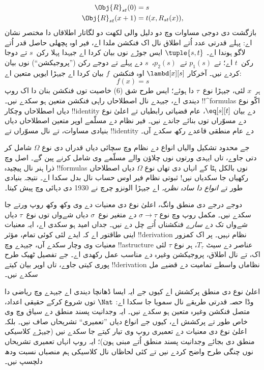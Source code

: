 \documentclass[../../../include/open-logic-section]{subfiles}
\begin{document}
\begin{align*}
\Obj{R}_{st}(0) & = s \\
\Obj{R}_{st}(x+1) & = t(x, R_{st}(x)),
\end{align*}
بازگشت دی دوجی مساوات وچ دو دلیل والی لکھت
دو لگاتار اطلاقاں دا مختصر نشان اے: پہلے قدرتی عدد
اُتے اطلاق نال اک فنکشن ملدا اے، فیر اوہ پچھلی
حاصل قدر اُتے لاگو ہوندا اے۔
$\tuple{s, t}$ ایس جوڑے
نوں بیان کردا اے جیہدا
پہلا رکن~$s$ تے دوجا
رکن~$t$ اے؛ تے $p_1(s)$
تے~$p_2(s)$،~$s$ دے
پہلے تے دوجے رکن
(”پروجیکشن“) نوں بیان
کردے نیں۔ آخرکار
$\lambd[x][s]$ اوہ
فنکشن~$f$ بیان کردا
اے جیہڑا ایویں
متعین اے:
\[
f(x) = s
\]
ہر~$x$ لئی، جیہڑا
نوع~$\tau$ دا ہوئے؛
ایس طرح شق (6)
خاصیت توں فنکشن بنان
دا اک روپ دیندی اے،
جیہدے نال اصطلاحاں
راہی فنکشن متعین
ہو سکدے نیں۔
!!^{formula}s اکّو
نوع دیاں اصطلاحاں
وچکار !!{identity}
دے بیان $\eq[s][t]$،
عام قضیاتی رابطیاں
تے اعلیٰ نوع دے
مسوّراں توں بنائے
جاندے نیں۔ فیر
نظام دے مسلّمے
اوپر متعین اصطلاحاں
دیاں بنیادی مساوات،
تے نال مسوّراں
تے !!{identity}
دے عام منطقی
قاعدے رکھ سکدے
آں۔

جے محدود تشکیل والیاں انواع دے
نظام وچ سچائی دیاں
قدراں دی نوع
$\Omega$ شامل کر
دتی جاوے، تاں
ایہدی ورتوں نوں
چلاؤن والے مسلّمے
وی شامل کرنے
پین گے۔ اصل وچ
ذرا ہنر نال
پیچیدہ !!{formula}s
نوں بالکل ہٹا
کے انہاں دی
تھاں نوع $\Omega$
دیاں اصطلاحاں
رکھیاں جا
سکدیاں نیں!{}
ثبوتی نظام
فیر اوس حساب
نال بدل
سکدا اے۔
نتیجہ بنیادی
طور تے
\emph{انواع دا
سادہ نظریہ}
اے جیہڑا
الونزو چرچ
نے 1930 دی
دہائی وچ
پیش کیتا۔

دوجے درجے
دی منطق
وانگ، اعلیٰ
نوع دی معنیات
دے وی وکھ
وکھ روپ
ورتے جا
سکدے نیں۔
مکمل روپ
وچ نوع
$\sigma \to \tau$
دے متغیر
نوع~$\sigma$
دیاں شےواں
توں نوع~$\tau$
دیاں شےواں
تک دے
\emph{سارے}
فنکشناں
اُتے چل
دے نیں۔
جداں امید
ہو سکدی
اے، ایہ
معنیات
اینی طاقتور
اے کہ
ایدے لئی
کوئی تمام،
مؤثر
!!{derivation}
نظام نہیں۔
پر اک
کمزور معنیات
وی وچار
سکدے آں،
جیہدے وچ
!!a{structure}
عناصر دے
سیٹ
$T_\tau$،
ہر نوع
$\tau$ لئی
اک، تے نال
اطلاق،
پروجیکشن
وغیرہ دے
مناسب عمل
رکھدی اے۔
جے تفصیل
ٹھیک طرح
پوری کیتی
جاوے، تاں
اوپر بیان
کیتے
!!{derivation}
نظاماں
واسطے
تمامیت دے
قضیے مل
سکدے نیں۔

اعلیٰ نوع
دی منطق
پرکشش اے
کیوں جے
ایہ ایسا
ڈھانچا دیندی
اے جیہدے
وچ ریاضی
دا وڈا حصہ
قدرتی طریقے
نال سمویا
جا سکدا اے:
$\Nat$
توں شروع
کرکے حقیقی
اعداد،
متصل فنکشن
وغیرہ متعین
ہو سکدے
نیں۔ ایہ
وجدانیت
پسند منطق
دے سیاق
وچ وی خاص
طور تے
پرکشش اے،
کیوں جے
انواع دیاں
”تعمیری“
تشریحاں
صاف نیں۔
بلکہ اعلیٰ
نوع دی
معنیات دے
تعمیری روپ
وی تیار
کیتے جا
سکدے نیں
(جیہڑے
کلاسیکی
منطق دی
بجائے
وجدانیت
پسند منطق
اُتے مبنی
ہون)؛
ایہ روپ
انہاں
تعمیری
تشریحاں
نوں چنگی
طرح واضح
کردے نیں
تے کئی
لحاظاں
نال کلاسیکی
ہم منصباں
نسبت ودھ
دلچسپ نیں۔
\end{document}
